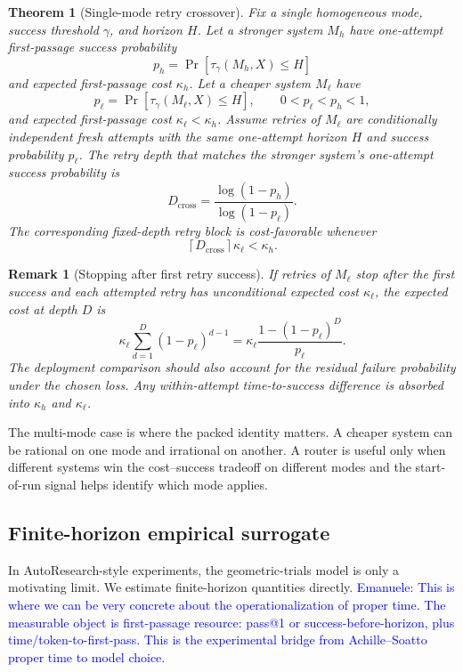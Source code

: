 \documentclass{article}
\newtheorem{theorem}{Theorem}
\newtheorem{remark}{Remark}
\begin{document}
\begin{theorem}[Single-mode retry crossover]
\label{thm:crossover}
Fix a single homogeneous mode, success threshold \(\gamma\), and horizon \(H\).
Let a stronger system \(M_h\) have one-attempt first-passage success probability
\[
    p_h=\Pr[\tau_\gamma(M_h,X)\le H]
\]
and expected first-passage cost \(\kappa_h\).  Let a cheaper system \(M_\ell\) have
\[
    p_\ell=\Pr[\tau_\gamma(M_\ell,X)\le H],
    \qquad
    0<p_\ell<p_h<1,
\]
and expected first-passage cost \(\kappa_\ell<\kappa_h\).
Assume retries of \(M_\ell\) are conditionally independent fresh attempts with the same
one-attempt horizon \(H\) and success probability \(p_\ell\).  The retry depth that matches
the stronger system's one-attempt success probability is
\[
    D_{\mathrm{cross}}
    =
    \frac{\log(1-p_h)}{\log(1-p_\ell)}.
\]
The corresponding fixed-depth retry block is cost-favorable whenever
\[
    \left\lceil D_{\mathrm{cross}}\right\rceil\kappa_\ell < \kappa_h .
\]
\end{theorem}

\begin{remark}[Stopping after first retry success]
If retries of \(M_\ell\) stop after the first success and each attempted retry has
unconditional expected cost \(\kappa_\ell\), the expected cost at depth \(D\) is
\[
    \kappa_\ell
    \sum_{d=1}^{D}(1-p_\ell)^{d-1}
    =
    \kappa_\ell\frac{1-(1-p_\ell)^D}{p_\ell}.
\]
The deployment comparison should also account for the residual failure probability under
the chosen loss.  Any within-attempt time-to-success difference is absorbed into
\(\kappa_h\) and \(\kappa_\ell\).
\end{remark}

The multi-mode case is where the packed identity matters.  A cheaper system can be
rational on one mode and irrational on another.  A router is useful only when different
systems win the cost--success tradeoff on different modes and the start-of-run signal helps
identify which mode applies.



\subsection{Finite-horizon empirical surrogate}

In AutoResearch-style experiments, the geometric-trials model is only a motivating limit.
We estimate finite-horizon quantities directly.
\textcolor{blue}{Emanuele: This is where we can be very concrete about the operationalization of proper time. The measurable object is first-passage resource: pass@1 or success-before-horizon, plus time/token-to-first-pass. This is the experimental bridge from Achille--Soatto proper time to model choice.}
\end{document}

